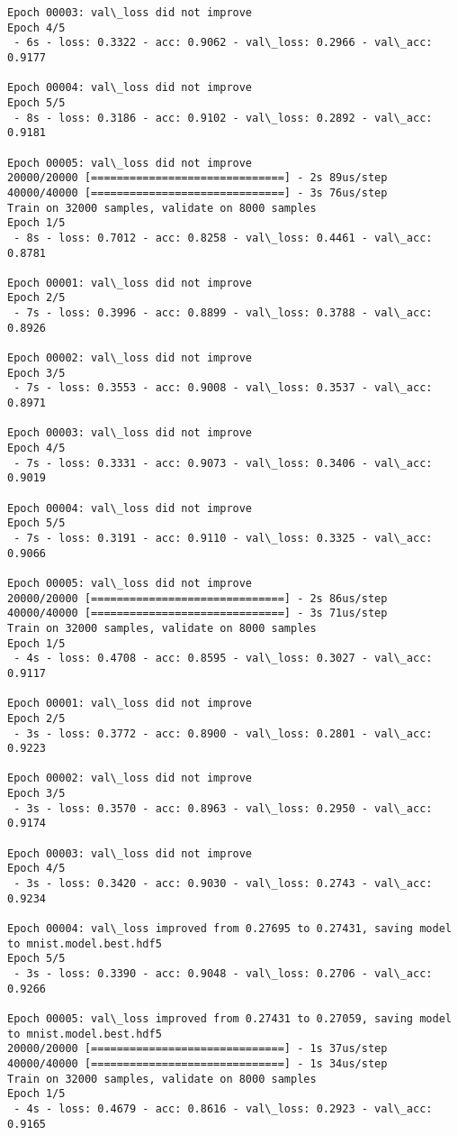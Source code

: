 \documentclass[11pt]{article}
\begin{document}
\begin{Verbatim}[commandchars=\\\{\}]
Epoch 00003: val\_loss did not improve
Epoch 4/5
 - 6s - loss: 0.3322 - acc: 0.9062 - val\_loss: 0.2966 - val\_acc: 0.9177

Epoch 00004: val\_loss did not improve
Epoch 5/5
 - 8s - loss: 0.3186 - acc: 0.9102 - val\_loss: 0.2892 - val\_acc: 0.9181

Epoch 00005: val\_loss did not improve
20000/20000 [==============================] - 2s 89us/step
40000/40000 [==============================] - 3s 76us/step
Train on 32000 samples, validate on 8000 samples
Epoch 1/5
 - 8s - loss: 0.7012 - acc: 0.8258 - val\_loss: 0.4461 - val\_acc: 0.8781

Epoch 00001: val\_loss did not improve
Epoch 2/5
 - 7s - loss: 0.3996 - acc: 0.8899 - val\_loss: 0.3788 - val\_acc: 0.8926

Epoch 00002: val\_loss did not improve
Epoch 3/5
 - 7s - loss: 0.3553 - acc: 0.9008 - val\_loss: 0.3537 - val\_acc: 0.8971

Epoch 00003: val\_loss did not improve
Epoch 4/5
 - 7s - loss: 0.3331 - acc: 0.9073 - val\_loss: 0.3406 - val\_acc: 0.9019

Epoch 00004: val\_loss did not improve
Epoch 5/5
 - 7s - loss: 0.3191 - acc: 0.9110 - val\_loss: 0.3325 - val\_acc: 0.9066

Epoch 00005: val\_loss did not improve
20000/20000 [==============================] - 2s 86us/step
40000/40000 [==============================] - 3s 71us/step
Train on 32000 samples, validate on 8000 samples
Epoch 1/5
 - 4s - loss: 0.4708 - acc: 0.8595 - val\_loss: 0.3027 - val\_acc: 0.9117

Epoch 00001: val\_loss did not improve
Epoch 2/5
 - 3s - loss: 0.3772 - acc: 0.8900 - val\_loss: 0.2801 - val\_acc: 0.9223

Epoch 00002: val\_loss did not improve
Epoch 3/5
 - 3s - loss: 0.3570 - acc: 0.8963 - val\_loss: 0.2950 - val\_acc: 0.9174

Epoch 00003: val\_loss did not improve
Epoch 4/5
 - 3s - loss: 0.3420 - acc: 0.9030 - val\_loss: 0.2743 - val\_acc: 0.9234

Epoch 00004: val\_loss improved from 0.27695 to 0.27431, saving model to mnist.model.best.hdf5
Epoch 5/5
 - 3s - loss: 0.3390 - acc: 0.9048 - val\_loss: 0.2706 - val\_acc: 0.9266

Epoch 00005: val\_loss improved from 0.27431 to 0.27059, saving model to mnist.model.best.hdf5
20000/20000 [==============================] - 1s 37us/step
40000/40000 [==============================] - 1s 34us/step
Train on 32000 samples, validate on 8000 samples
Epoch 1/5
 - 4s - loss: 0.4679 - acc: 0.8616 - val\_loss: 0.2923 - val\_acc: 0.9165


\end{Verbatim}
\end{document}
